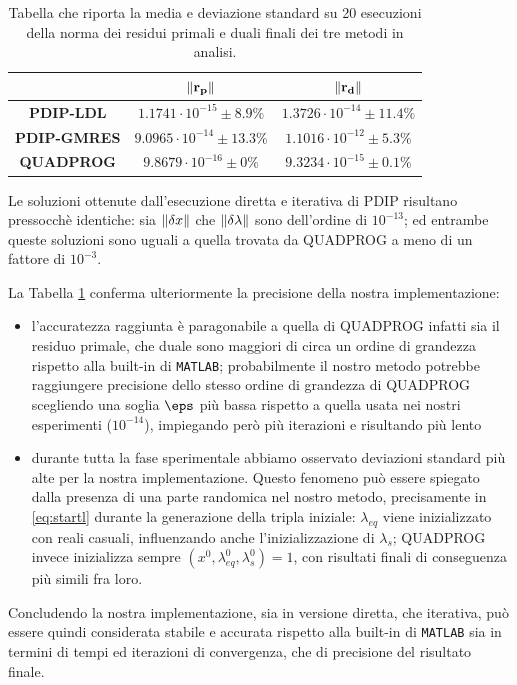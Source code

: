 \begin{table}[!h]
\centering
\begin{tabular}{c|c|c}
\textbf{}           & $\mathbf{\left\lVert r_p\right\rVert}$ & $\mathbf{\left\lVert r_d\right\rVert}$ \\\hline
\textbf{PDIP-LDL} &      $1.1741\cdot10^{-15} \pm8.9\%$                 &           $1.3726\cdot10^{-14} \pm11.4\%$             \\\hline
\textbf{PDIP-GMRES}   &        $9.0965\cdot10^{-14} \pm13.3\%$               &            $1.1016\cdot10^{-12} \pm5.3\%$           \\\hline
\textbf{QUADPROG}   &      $9.8679\cdot10^{-16} \pm0\%$                &            $9.3234\cdot10^{-15} \pm0.1\%$   \\    
\end{tabular}
\caption{Tabella che riporta la media e deviazione standard su 20 esecuzioni della norma dei residui primali e duali finali dei tre metodi in analisi.}
\label{tab:res}
\end{table}

Le soluzioni ottenute dall'esecuzione diretta e iterativa di PDIP risultano pressocchè identiche: sia $\left\lVert\delta x\right\rVert$ che $\left\lVert\delta\lambda\right\rVert$ sono dell'ordine di $10^{-13}$; ed entrambe queste soluzioni sono uguali a quella trovata da QUADPROG a meno di un fattore di $10^{-3}$.

La Tabella \ref{tab:res} conferma ulteriormente la precisione della nostra implementazione: 
\begin{itemize}
    \item l'accuratezza raggiunta è paragonabile a quella di QUADPROG infatti sia il residuo primale, che duale sono maggiori di circa un ordine di grandezza rispetto alla built-in di \texttt{MATLAB}; probabilmente il nostro metodo potrebbe raggiungere precisione dello stesso ordine di grandezza di QUADPROG scegliendo una soglia $\eps$ più bassa rispetto a quella usata nei nostri esperimenti ($10^{-14}$), impiegando però più iterazioni e risultando più lento
    \item durante tutta la fase sperimentale abbiamo osservato deviazioni standard più alte per la nostra implementazione. Questo fenomeno può essere spiegato dalla presenza di una parte randomica nel nostro metodo, precisamente in \ref{eq:startl} durante la generazione della tripla iniziale: $\lambda_{eq}$ viene inizializzato con reali casuali, influenzando anche l'inizializzazione di $\lambda_s$; QUADPROG invece inizializza sempre $(x^0, \lambda_{eq}^0, \lambda_s^0) = 1$, con risultati finali di conseguenza più simili fra loro.
\end{itemize}

Concludendo la nostra implementazione, sia in versione diretta, che iterativa, può essere quindi considerata stabile e accurata rispetto alla built-in di \texttt{MATLAB} sia in termini di tempi ed iterazioni di convergenza, che di precisione del risultato finale.